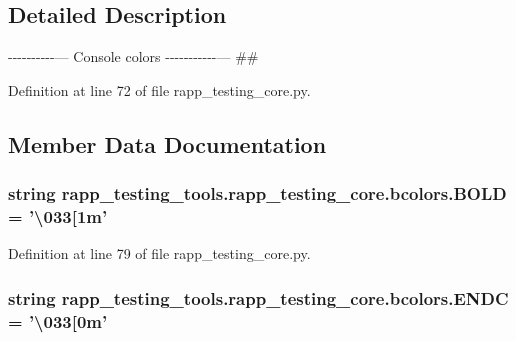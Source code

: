 \subsection{Detailed Description}
-\/-\/-\/-\/-\/-\/-\/-\/-\/-\/--- Console colors -\/-\/-\/-\/-\/-\/-\/-\/-\/-\/-\/--- \#\# 

Definition at line 72 of file rapp\-\_\-testing\-\_\-core.\-py.



\subsection{Member Data Documentation}
\hypertarget{classrapp__testing__tools_1_1rapp__testing__core_1_1bcolors_a780268b94b840ba5fe9e401697f6c0a7}{
\subsubsection[{B\-O\-L\-D}]{\setlength{\rightskip}{0pt plus 5cm}string rapp\-\_\-testing\-\_\-tools.\-rapp\-\_\-testing\-\_\-core.\-bcolors.\-B\-O\-L\-D = '\textbackslash{}033\mbox{[}1m'\hspace{0.3cm}{\ttfamily [static]}}}\label{classrapp__testing__tools_1_1rapp__testing__core_1_1bcolors_a780268b94b840ba5fe9e401697f6c0a7}


Definition at line 79 of file rapp\-\_\-testing\-\_\-core.\-py.

\hypertarget{classrapp__testing__tools_1_1rapp__testing__core_1_1bcolors_aab5d82cfed6414c1a8d9bd71fa02293e}{
\subsubsection[{E\-N\-D\-C}]{\setlength{\rightskip}{0pt plus 5cm}string rapp\-\_\-testing\-\_\-tools.\-rapp\-\_\-testing\-\_\-core.\-bcolors.\-E\-N\-D\-C = '\textbackslash{}033\mbox{[}0m'\hspace{0.3cm}{\ttfamily [static]}}}\label{classrapp__testing__tools_1_1rapp__testing__core_1_1bcolors_aab5d82cfed6414c1a8d9bd71fa02293e}


